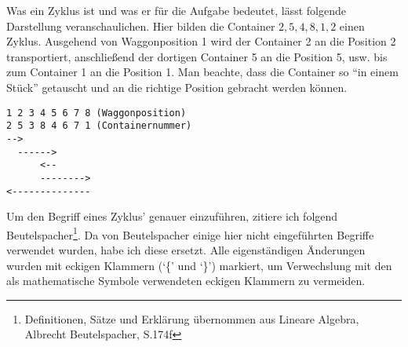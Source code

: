 Was ein Zyklus ist und was er für die Aufgabe bedeutet, lässt folgende Darstellung veranschaulichen.
Hier bilden die Container $2,5,4,8,1,2$ einen Zyklus. Ausgehend von Waggonposition 1 wird der Container 2 an die Position 2 transportiert,
anschließend der dortigen Container 5 an die Position 5, usw. bis zum Container 1 an die Position 1.
Man beachte, dass die Container so ``in einem Stück'' getauscht und an die richtige Position gebracht werden können.
\lstset{basicstyle=\ttfamily}
\begin{lstlisting}
1 2 3 4 5 6 7 8 (Waggonposition)
2 5 3 8 4 6 7 1 (Containernummer)
-->
  ------>
      <--
      -------->
<--------------
\end{lstlisting}
\lstset{basicstyle=\ttfamily}
Um den Begriff eines Zyklus' genauer einzuführen, zitiere ich folgend Beutelspacher\footnote{Definitionen, Sätze und Erklärung übernommen aus Lineare Algebra, Albrecht Beutelspacher, S.174f}.
Da von Beutelspacher einige hier nicht eingeführten Begriffe verwendet wurden, habe ich diese ersetzt.
Alle eigenständigen Änderungen wurden mit eckigen Klammern (`\{' und `\}') markiert, um Verwechslung mit den als mathematische Symbole verwendeten eckigen Klammern zu vermeiden.
